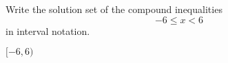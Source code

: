 

Write the solution set of the compound inequalities
\[-6\leq x <6 \]
in interval notation.

\begin{solution}
$[-6, 6)$
\end{solution}